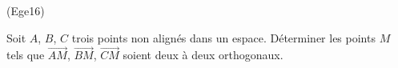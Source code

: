 \begin{tiny}(Ege16)\end{tiny} Soit $A$, $B$, $C$ trois points non alignés dans un espace. Déterminer les points $M$ tels que $\overrightarrow{AM}$, $\overrightarrow{BM}$, $\overrightarrow{CM}$ soient deux à deux orthogonaux. 